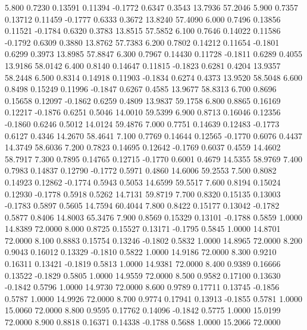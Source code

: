    5.800   0.7230   0.13591   0.11394  -0.1772   0.6347   0.3543  13.7936  57.2046
   5.900   0.7357   0.13712   0.11459  -0.1777   0.6333   0.3672  13.8240  57.4090
   6.000   0.7496   0.13856   0.11521  -0.1784   0.6320   0.3783  13.8515  57.5852
   6.100   0.7646   0.14022   0.11586  -0.1792   0.6309   0.3880  13.8762  57.7383
   6.200   0.7802   0.14212   0.11654  -0.1801   0.6299   0.3973  13.8985  57.8847
   6.300   0.7967   0.14430   0.11728  -0.1811   0.6289   0.4055  13.9186  58.0142
   6.400   0.8140   0.14647   0.11815  -0.1823   0.6281   0.4204  13.9357  58.2448
   6.500   0.8314   0.14918   0.11903  -0.1834   0.6274   0.4373  13.9520  58.5048
   6.600   0.8498   0.15249   0.11996  -0.1847   0.6267   0.4585  13.9677  58.8313
   6.700   0.8696   0.15658   0.12097  -0.1862   0.6259   0.4809  13.9837  59.1758
   6.800   0.8865   0.16169   0.12217  -0.1876   0.6251   0.5046  14.0010  59.5399
   6.900   0.8713   0.16046   0.12356  -0.1860   0.6246   0.5012  14.0124  59.4876
   7.000   0.7751   0.14639   0.12483  -0.1773   0.6127   0.4346  14.2670  58.4641
   7.100   0.7769   0.14644   0.12565  -0.1770   0.6076   0.4437  14.3749  58.6036
   7.200   0.7823   0.14695   0.12642  -0.1769   0.6037   0.4559  14.4602  58.7917
   7.300   0.7895   0.14765   0.12715  -0.1770   0.6001   0.4679  14.5355  58.9769
   7.400   0.7983   0.14837   0.12790  -0.1772   0.5971   0.4860  14.6006  59.2553
   7.500   0.8082   0.14923   0.12862  -0.1774   0.5943   0.5053  14.6599  59.5517
   7.600   0.8194   0.15024   0.12930  -0.1778   0.5918   0.5262  14.7131  59.8719
   7.700   0.8320   0.15135   0.13003  -0.1783   0.5897   0.5605  14.7594  60.4044
   7.800   0.8422   0.15177   0.13042  -0.1782   0.5877   0.8406  14.8003  65.3476
   7.900   0.8569   0.15329   0.13101  -0.1788   0.5859   1.0000  14.8389  72.0000
   8.000   0.8725   0.15527   0.13171  -0.1795   0.5845   1.0000  14.8701  72.0000
   8.100   0.8883   0.15754   0.13246  -0.1802   0.5832   1.0000  14.8965  72.0000
   8.200   0.9043   0.16012   0.13329  -0.1810   0.5822   1.0000  14.9186  72.0000
   8.300   0.9210   0.16311   0.13421  -0.1819   0.5813   1.0000  14.9381  72.0000
   8.400   0.9389   0.16666   0.13522  -0.1829   0.5805   1.0000  14.9559  72.0000
   8.500   0.9582   0.17100   0.13630  -0.1842   0.5796   1.0000  14.9730  72.0000
   8.600   0.9789   0.17711   0.13745  -0.1856   0.5787   1.0000  14.9926  72.0000
   8.700   0.9774   0.17941   0.13913  -0.1855   0.5781   1.0000  15.0060  72.0000
   8.800   0.9595   0.17762   0.14096  -0.1842   0.5775   1.0000  15.0199  72.0000
   8.900   0.8818   0.16371   0.14338  -0.1788   0.5688   1.0000  15.2066  72.0000
